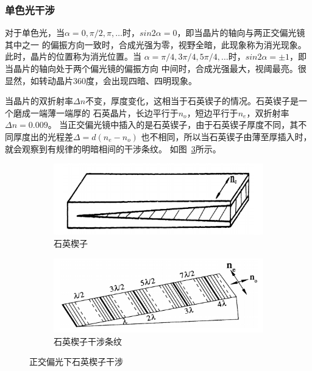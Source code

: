 \documentclass[11pt,a4paper]{article}
\begin{document}
\begin{spacing}{1.3}
\begin{CJK*}{UTF8}{gbsn}
\subsubsection{单色光干涉}
对于单色光，当$\alpha=0,\pi/2,\pi,\ldots$时，$sin2\alpha=0$，即当晶片的轴向与两正交偏光镜其中之一
的偏振方向一致时，合成光强为零，视野全暗，此现象称为消光现象。此时，晶片的位置称为消光位置。当
$\alpha=\pi/4,3\pi/4,5\pi/4,\ldots$时，$sin2\alpha=\pm 1$，即当晶片的轴向处于两个偏光镜的偏振方向
中间时，合成光强最大，视阈最亮。很显然，如转动晶片$360$度，会出现四暗、四明现象。\par

当晶片的双折射率$\Delta n$不变，厚度变化，这相当于石英锲子的情况。石英锲子是一个磨成一端薄一端厚的
石英晶片，长边平行于$n_o$，短边平行于$n_e$，双折射率$\Delta n=0.009$。
当正交偏光镜中插入的是石英锲子，由于石英锲子厚度不同，其不同厚度出的光程差$\Delta=d(n_e-n_o)$
也不相同，所以当石英锲子由薄至厚插入时，就会观察到有规律的明暗相间的干涉条纹。
如图~\ref{fig:4-1-5}所示。
\begin{figure}[htbp]
\begin{subfigure}[b]{0.5\textwidth}
\includegraphics[width=\linewidth]{fig4-1-5a}
\caption{石英楔子}
\label{fig:4-1-5a}
\end{subfigure}
\begin{subfigure}[b]{0.49\textwidth}
\includegraphics[width=\linewidth]{fig4-1-5b}
\caption{石英楔子干涉条纹}
\label{fig:4-1-5b}
\end{subfigure}
\caption{正交偏光下石英楔子干涉}\label{fig:4-1-5}
\end{figure} 

\end{CJK*}
\end{spacing}
\end{document}

